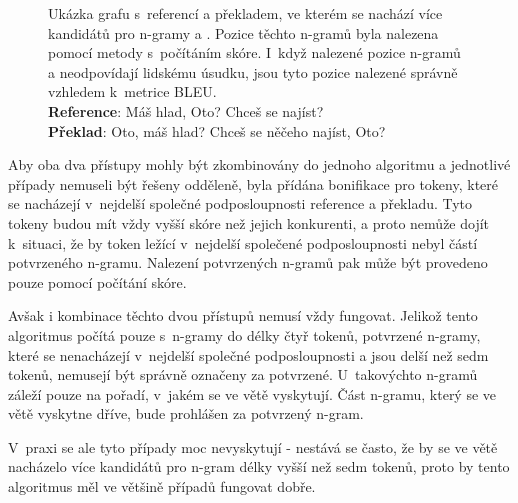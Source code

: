 \begin{figure}[h!]

	\caption{
		Ukázka grafu s~referencí a překladem, ve kterém se nachází více kandidátů pro \mbox{n-gramy}  a \uv{,}.
		Pozice těchto \mbox{n-gramů} byla nalezena pomocí metody s~počítáním skóre.
		I~když nalezené pozice \mbox{n-gramů}  a \uv{,} neodpovídají lidskému úsudku,
		jsou tyto pozice nalezené správně vzhledem k~metrice BLEU. \\
		\textbf{Reference}: Máš hlad, Oto? Chceš se najíst?\\
		\textbf{Překlad}: Oto, máš hlad? Chceš se něčeho najíst, Oto?
	}
	\label{img:graph-6}
\end{figure}
  
Aby oba dva přístupy mohly být zkombinovány do jednoho algoritmu a
  jednotlivé případy nemuseli být řešeny odděleně,
  byla přídána bonifikace pro tokeny,
  které se nacházejí v~nejdelší společné podposloupnosti reference a překladu.
Tyto tokeny budou mít vždy vyšší skóre než jejich konkurenti,
  a proto nemůže dojít k~situaci,
  že by token ležící v~nejdelší společené podposloupnosti nebyl částí potvrzeného \mbox{n-gramu}.
Nalezení potvrzených \mbox{n-gramů} pak může být provedeno pouze pomocí počítání skóre.


Avšak i kombinace těchto dvou přístupů nemusí vždy fungovat.
Jelikož tento algoritmus počítá pouze s~\mbox{n-gramy} do délky čtyř tokenů,
  potvrzené \mbox{n-gramy},
  které se nenacházejí v~nejdelší společné podposloupnosti a jsou delší než sedm tokenů,
  nemusejí být správně označeny za potvrzené.
U~takovýchto \mbox{n-gramů} záleží pouze na pořadí, v~jakém se ve větě vyskytují.
Část \mbox{n-gramu},
  který se ve větě vyskytne dříve,
  bude prohlášen za potvrzený \mbox{n-gram}.

V~praxi se ale tyto případy moc nevyskytují -
  nestává se často, že by se ve větě nacházelo více kandidátů pro \mbox{n-gram} délky vyšší než sedm tokenů,
  proto by tento algoritmus měl ve většině případů fungovat dobře.


